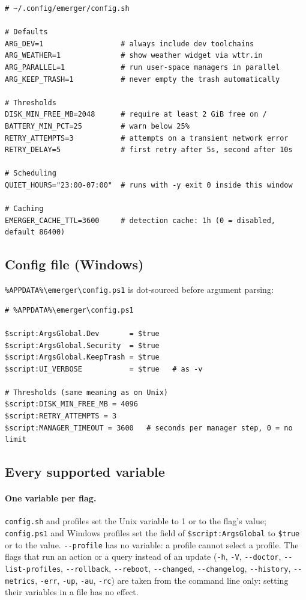 \documentclass[11pt,a4paper]{article}
\begin{document}
\begin{lstlisting}[language=bashplus]
# ~/.config/emerger/config.sh

# Defaults
ARG_DEV=1                  # always include dev toolchains
ARG_WEATHER=1              # show weather widget via wttr.in
ARG_PARALLEL=1             # run user-space managers in parallel
ARG_KEEP_TRASH=1           # never empty the trash automatically

# Thresholds
DISK_MIN_FREE_MB=2048      # require at least 2 GiB free on /
BATTERY_MIN_PCT=25         # warn below 25%
RETRY_ATTEMPTS=3           # attempts on a transient network error
RETRY_DELAY=5              # first retry after 5s, second after 10s

# Scheduling
QUIET_HOURS="23:00-07:00"  # runs with -y exit 0 inside this window

# Caching
EMERGER_CACHE_TTL=3600     # detection cache: 1h (0 = disabled, default 86400)
\end{lstlisting}

\subsection{Config file (Windows)}

\verb|%APPDATA%\emerger\config.ps1| is dot-sourced before argument
parsing:

\begin{lstlisting}[language=psplus]
# %APPDATA%\emerger\config.ps1

$script:ArgsGlobal.Dev       = $true
$script:ArgsGlobal.Security  = $true
$script:ArgsGlobal.KeepTrash = $true
$script:UI_VERBOSE           = $true   # as -v

# Thresholds (same meaning as on Unix)
$script:DISK_MIN_FREE_MB = 4096
$script:RETRY_ATTEMPTS = 3
$script:MANAGER_TIMEOUT = 3600   # seconds per manager step, 0 = no limit
\end{lstlisting}

\subsection{Every supported variable}

\paragraph{One variable per flag.} \texttt{config.sh} and profiles set the
Unix variable to 1 or to the flag's value; \texttt{config.ps1} and Windows
profiles set the field of \verb|$script:ArgsGlobal| to \verb|$true| or to the
value. \texttt{-{}-profile} has no variable: a profile cannot select a
profile. The flags that run an action or a query instead of an update
(\texttt{-h}, \texttt{-V}, \texttt{-{}-doctor}, \texttt{-{}-list-profiles},
\texttt{-{}-rollback}, \texttt{-{}-reboot}, \texttt{-{}-changed},
\texttt{-{}-changelog}, \texttt{-{}-history}, \texttt{-{}-metrics},
\texttt{-err}, \texttt{-up}, \texttt{-au}, \texttt{-rc}) are taken from the
command line only: setting their variables in a file has no effect.
\end{document}
